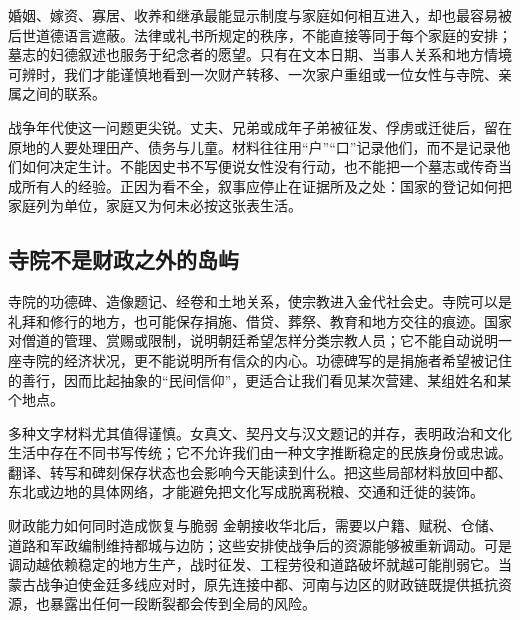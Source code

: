 婚姻、嫁资、寡居、收养和继承最能显示制度与家庭如何相互进入，却也最容易被后世道德语言遮蔽。法律或礼书所规定的秩序，不能直接等同于每个家庭的安排；墓志的妇德叙述也服务于纪念者的愿望。只有在文本日期、当事人关系和地方情境可辨时，我们才能谨慎地看到一次财产转移、一次家户重组或一位女性与寺院、亲属之间的联系。

战争年代使这一问题更尖锐。丈夫、兄弟或成年子弟被征发、俘虏或迁徙后，留在原地的人要处理田产、债务与儿童。材料往往用“户”“口”记录他们，而不是记录他们如何决定生计。不能因史书不写便说女性没有行动，也不能把一个墓志或传奇当成所有人的经验。正因为看不全，叙事应停止在证据所及之处：国家的登记如何把家庭列为单位，家庭又为何未必按这张表生活。

\subsection{寺院不是财政之外的岛屿}

寺院的功德碑、造像题记、经卷和土地关系，使宗教进入金代社会史。寺院可以是礼拜和修行的地方，也可能保存捐施、借贷、葬祭、教育和地方交往的痕迹。国家对僧道的管理、赏赐或限制，说明朝廷希望怎样分类宗教人员；它不能自动说明一座寺院的经济状况，更不能说明所有信众的内心。功德碑写的是捐施者希望被记住的善行，因而比起抽象的“民间信仰”，更适合让我们看见某次营建、某组姓名和某个地点。

多种文字材料尤其值得谨慎。女真文、契丹文与汉文题记的并存，表明政治和文化生活中存在不同书写传统；它不允许我们由一种文字推断稳定的民族身份或忠诚。翻译、转写和碑刻保存状态也会影响今天能读到什么。把这些局部材料放回中都、东北或边地的具体网络，才能避免把文化写成脱离税粮、交通和迁徙的装饰。

\begin{causalchain}{财政能力如何同时造成恢复与脆弱}
金朝接收华北后，需要以户籍、赋税、仓储、道路和军政编制维持都城与边防；这些安排使战争后的资源能够被重新调动。可是调动越依赖稳定的地方生产，战时征发、工程劳役和道路破坏就越可能削弱它。当蒙古战争迫使金廷多线应对时，原先连接中都、河南与边区的财政链既提供抵抗资源，也暴露出任何一段断裂都会传到全局的风险。
\end{causalchain}
